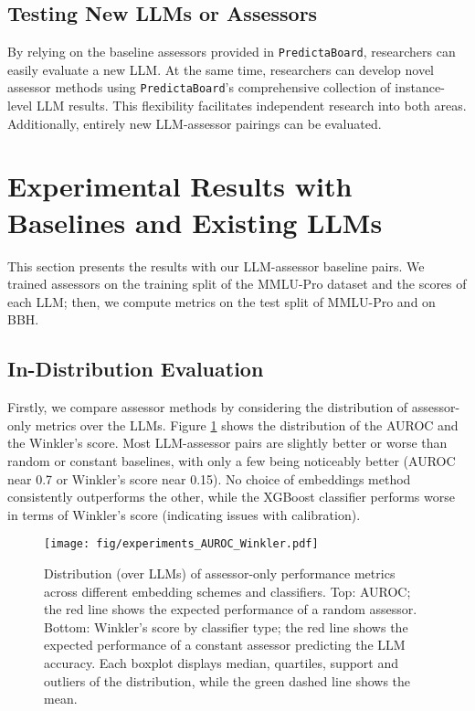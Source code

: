 \documentclass[11pt]{article}
\newcommand{\predbench}{{\tt PredictaBoard}\xspace}
\begin{document}
\subsection{Testing New LLMs or Assessors}
\label{subsec:test_subjects_assessors}
By relying on the baseline assessors provided in \predbench, researchers can easily evaluate a new LLM. At the same time, researchers can develop novel assessor methods using \predbench's comprehensive collection of instance-level LLM results. This flexibility facilitates independent research into both areas. Additionally, entirely new LLM-assessor pairings can be evaluated.

\section{Experimental Results with Baselines and Existing LLMs}
\label{sec:experimental_results}

This section presents the results with our LLM-assessor baseline pairs. We trained assessors on the training split of the MMLU-Pro dataset and the scores of each LLM; then, we compute metrics on the test split of MMLU-Pro and on BBH. %

\subsection{In-Distribution Evaluation}
Firstly, we compare assessor methods by considering the distribution of assessor-only metrics over the LLMs. Figure \ref{fig:experiments_AUROC_Brier} shows the distribution of the AUROC and the Winkler's score. Most LLM-assessor pairs are slightly better or worse than random or constant baselines, with only a few being noticeably better (AUROC near 0.7 or Winkler's score near 0.15). No choice of embeddings method consistently outperforms the other, while the XGBoost classifier performs worse in terms of Winkler's score (indicating issues with calibration).


\begin{figure}[!ht]
    \centering
    \texttt{[image: fig/experiments\_AUROC\_Winkler.pdf]}
    \caption{Distribution (over LLMs) of assessor-only performance metrics across different embedding schemes and classifiers. Top: AUROC; the red line shows the expected performance of a random assessor. Bottom: Winkler's score by classifier type; the red line shows the expected performance of a constant assessor predicting the LLM accuracy. Each boxplot displays median, quartiles, support and outliers of the distribution, while the green dashed line shows the mean.}
    \label{fig:experiments_AUROC_Brier}
\end{figure}
\end{document}
